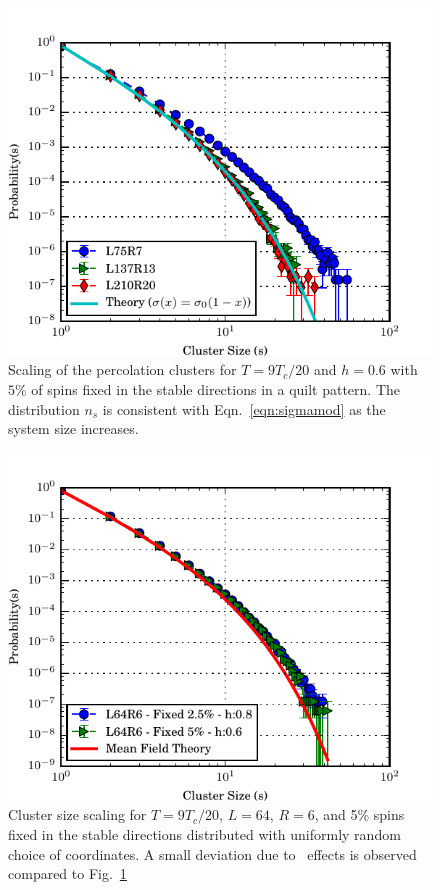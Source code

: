 \begin{figure}[!h]
 \centering
 \includegraphics[scale=1.2]{Figures/cluster/percHeter01-quilt_2.pdf}
 \caption{Scaling of the percolation clusters for $T=9T_c/20$ and $h=0.6$ with $5\%$  of spins fixed in the stable directions in a quilt pattern. The distribution $n_s$ is consistent with Eqn.~\eqref{eqn:sigmamod} as the system size increases.
}
 \label{fig:percclusterquilt}
\end{figure}%
\begin{figure}[!h]
 \centering
 \includegraphics[scale=1.1]{Figures/cluster/percHeter-ranDel.pdf}
 \caption{Cluster size scaling for $T=9T_c/20$, $L=64$, $R=6$, and 5\% spins fixed in the stable directions distributed with uniformly random choice of coordinates. A small deviation due to \het\ effects is observed  compared to Fig.~\ref{fig:percclusterquilt}}
 \label{fig:percclusterheter}
\end{figure}%

